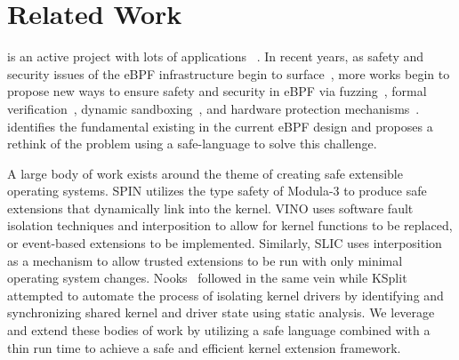 \section{Related Work}

 is an active project with lots of applications
~\cite{BMC,Electrode,DINT,Hoiland-Jorgensen:conext:2018,Zhong:osdi:2022,jia2023,ebpf-kcfi}.
In recent years, as safety and security issues of the eBPF infrastructure begin
    to
    surface~\cite{EPF,CVE-2021-31440,CVE-2022-23222,CVE-2022-2785,
        CVE-2021-29154,CVE-2021-45402},
    more works begin to propose new ways to ensure safety and security in eBPF
    via fuzzing~\cite{hung2023brf}, formal
    verification~\cite{ebpf-jit-formal,proof-carrying-verifier},
    dynamic sandboxing~\cite{sandbpf}, and hardware protection
    mechanisms~\cite{lu2023moat,ebpf-pks}.
\projname{} identifies the fundamental \gap{} existing in the current eBPF design and
    proposes a rethink of the problem using a safe-language to solve this challenge.

A large body of work exists around the theme of creating safe extensible operating
    systems.
SPIN \cite{spin} utilizes the type safety of Modula-3 to produce
    safe extensions that dynamically link into the kernel.
VINO \cite{vino} uses software fault isolation techniques and interposition to
    allow for kernel functions to be replaced, or event-based extensions to be
    implemented.
Similarly, SLIC \cite{slic} uses interposition as a mechanism to allow trusted
    extensions to be run with only minimal operating system changes.
Nooks~\cite{nooks} followed in the same vein while KSplit~\cite{ksplit} attempted to
automate the process of isolating kernel drivers by identifying and synchronizing
shared kernel and driver state using static analysis.
We leverage and extend these bodies of work by utilizing a safe language combined with
a thin run time to achieve a safe and efficient kernel extension framework.

